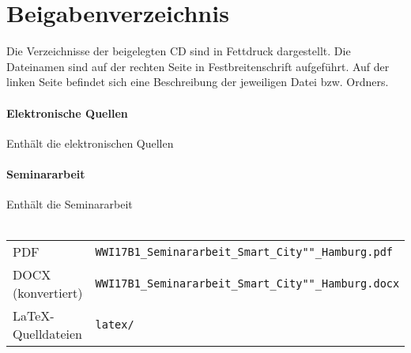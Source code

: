 \section{Beigabenverzeichnis} 

Die Verzeichnisse der beigelegten CD sind in Fettdruck dargestellt.
Die Dateinamen sind auf der rechten Seite in Festbreitenschrift aufgeführt.
Auf der linken Seite befindet sich eine Beschreibung der jeweiligen Datei bzw. Ordners.

\paragraph{Elektronische Quellen} Enthält die elektronischen Quellen \\

\paragraph{Seminararbeit} Enthält die Seminararbeit \\\\
\begin{tabular}{>{\raggedleft\arraybackslash}p{4cm}p{8cm}}
	                PDF & \texttt{WWI17B1\_Seminararbeit\_Smart\_City""\_Hamburg.pdf}  \\
	 DOCX (konvertiert) & \texttt{WWI17B1\_Seminararbeit\_Smart\_City""\_Hamburg.docx} \\
	\LaTeX -Quelldateien & \texttt{latex/}
\end{tabular}
